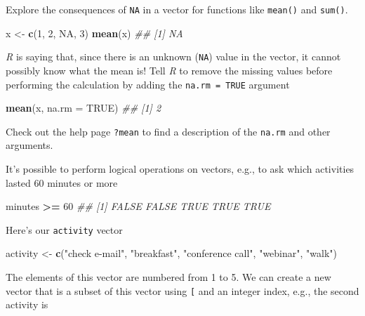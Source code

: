 \documentclass[]{book}
\newenvironment{Shaded}{\begin{snugshade}}{\end{snugshade}}
\newcommand{\CommentTok}[1]{\textcolor[rgb]{0.56,0.35,0.01}{\textit{#1}}}
\newcommand{\DataTypeTok}[1]{\textcolor[rgb]{0.13,0.29,0.53}{#1}}
\newcommand{\DecValTok}[1]{\textcolor[rgb]{0.00,0.00,0.81}{#1}}
\newcommand{\KeywordTok}[1]{\textcolor[rgb]{0.13,0.29,0.53}{\textbf{#1}}}
\newcommand{\NormalTok}[1]{#1}
\newcommand{\OperatorTok}[1]{\textcolor[rgb]{0.81,0.36,0.00}{\textbf{#1}}}
\newcommand{\OtherTok}[1]{\textcolor[rgb]{0.56,0.35,0.01}{#1}}
\newcommand{\StringTok}[1]{\textcolor[rgb]{0.31,0.60,0.02}{#1}}
\begin{document}
Explore the consequences of \texttt{NA} in a vector for functions like \texttt{mean()} and \texttt{sum()}.

\begin{Shaded}
\begin{Highlighting}[]
\NormalTok{x <-}\StringTok{ }\KeywordTok{c}\NormalTok{(}\DecValTok{1}\NormalTok{, }\DecValTok{2}\NormalTok{, }\OtherTok{NA}\NormalTok{, }\DecValTok{3}\NormalTok{)}
\KeywordTok{mean}\NormalTok{(x)}
\CommentTok{## [1] NA}
\end{Highlighting}
\end{Shaded}

\emph{R} is saying that, since there is an unknown (\texttt{NA}) value in the vector, it cannot possibly know what the mean is! Tell \emph{R} to remove the missing values before performing the calculation by adding the \texttt{na.rm\ =\ TRUE} argument

\begin{Shaded}
\begin{Highlighting}[]
\KeywordTok{mean}\NormalTok{(x, }\DataTypeTok{na.rm =} \OtherTok{TRUE}\NormalTok{)}
\CommentTok{## [1] 2}
\end{Highlighting}
\end{Shaded}

Check out the help page \texttt{?mean} to find a description of the \texttt{na.rm} and other arguments.

It's possible to perform logical operations on vectors, e.g., to ask which activities lasted 60 minutes or more

\begin{Shaded}
\begin{Highlighting}[]
\NormalTok{minutes }\OperatorTok{>=}\StringTok{ }\DecValTok{60}
\CommentTok{## [1] FALSE FALSE  TRUE  TRUE  TRUE}
\end{Highlighting}
\end{Shaded}

Here's our \texttt{activity} vector

\begin{Shaded}
\begin{Highlighting}[]
\NormalTok{activity <-}\StringTok{ }\KeywordTok{c}\NormalTok{(}\StringTok{"check e-mail"}\NormalTok{, }\StringTok{"breakfast"}\NormalTok{, }\StringTok{"conference call"}\NormalTok{, }\StringTok{"webinar"}\NormalTok{, }\StringTok{"walk"}\NormalTok{)}
\end{Highlighting}
\end{Shaded}

The elements of this vector are numbered from 1 to 5. We can create a new vector that is a subset of this vector using \texttt{{[}} and an integer index, e.g., the second activity is
\end{document}

